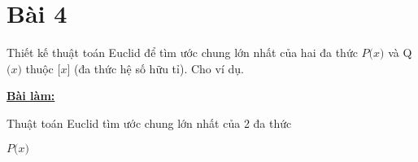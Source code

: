 \section*{Bài 4}
	
Thiết kế thuật toán Euclid để tìm ước chung lớn nhất của hai đa thức $P \big( x \big)$ và Q$\big( x \big)$ thuộc $\big[ x \big]$ (đa thức hệ số hữu tỉ). Cho ví dụ.

\begin{center}
    \textbf{\underline{Bài làm:}}
\end{center}

\begin{algorithm}
\renewcommand{\algorithmcfname}{Thuật toán}

\caption{Thuật toán Euclid tìm ước chung lớn nhất của 2 đa thức}
\SetAlgoNoEnd\SetAlgoNoLine%

\Return $P \big( x \big)$
\end{algorithm}

